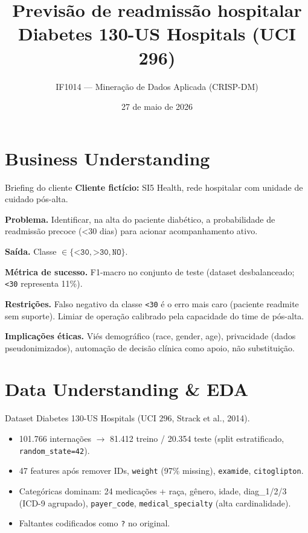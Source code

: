 \documentclass[aspectratio=169]{beamer}
\title[Diabetes 130-US]{Previsão de readmissão hospitalar\\\small{Diabetes 130-US Hospitals (UCI 296)}}
\subtitle{IF1014 — Mineração de Dados Aplicada (CRISP-DM)}
\author{Equipe \textit{João Pontes \and Marcos Antonio \and Theo Barza}}
\institute{UFPE — 2026.1}
\date{27 de maio de 2026}
\begin{document}
\frame{\titlepage}

\section{Business Understanding}

\begin{frame}{Briefing do cliente}
\textbf{Cliente fictício:} SI5 Health, rede hospitalar com unidade de cuidado pós-alta.

\vspace{0.6em}
\textbf{Problema.} Identificar, na alta do paciente diabético, a probabilidade de \alert{readmissão precoce} (<30 dias) para acionar acompanhamento ativo.

\vspace{0.6em}
\textbf{Saída.} Classe $\in \{\texttt{<30}, \texttt{>30}, \texttt{NO}\}$.

\vspace{0.6em}
\textbf{Métrica de sucesso.} F1-macro no conjunto de teste (dataset desbalanceado; \texttt{<30} representa 11\%).

\vspace{0.6em}
\textbf{Restrições.} Falso negativo da classe \texttt{<30} é o erro mais caro (paciente readmite sem suporte). Limiar de operação calibrado pela capacidade do time de pós-alta.

\vspace{0.6em}
\textbf{Implicações éticas.} Viés demográfico (race, gender, age), privacidade (dados pseudonimizados), automação de decisão clínica como apoio, não substituição.
\end{frame}

\section{Data Understanding \& EDA}

\begin{frame}{Dataset}
Diabetes 130-US Hospitals (UCI 296, Strack et al., 2014).
\begin{itemize}
  \item 101.766 internações $\rightarrow$ 81.412 treino / 20.354 teste (split estratificado, \texttt{random\_state=42}).
  \item 47 features após remover IDs, \texttt{weight} (97\% missing), \texttt{examide}, \texttt{citoglipton}.
  \item Categóricas dominam: 24 medicações + raça, gênero, idade, diag\_1/2/3 (ICD-9 agrupado), \texttt{payer\_code}, \texttt{medical\_specialty} (alta cardinalidade).
  \item Faltantes codificados como \texttt{?} no original.
\end{itemize}
\end{frame}
\end{document}
